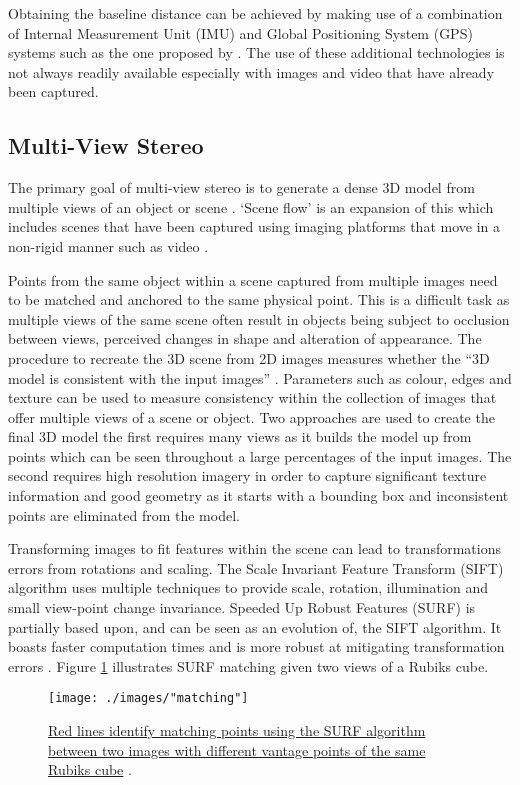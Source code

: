Obtaining the baseline distance can be achieved by making use of a combination of Internal Measurement Unit (IMU) and Global Positioning System (GPS) systems such as the one proposed by \citet{nutzi_fusion_2011}. The use of these additional technologies is not always readily available especially with images and video that have already been captured. 

\subsection{Multi-View Stereo \label{multi-view}}
The primary goal of multi-view stereo is to generate a dense 3D model from multiple views of an object or scene \citep{seitz_comparison_2006}. `Scene flow' is an expansion of this which includes scenes that have been captured using imaging platforms that move in a non-rigid manner such as video \citep{vedula_three-dimensional_2005}. 

Points from the same object within a scene captured from multiple images need to be matched and anchored to the same physical point. This is a difficult task as multiple views of the same scene often result in objects being subject to occlusion between views, perceived changes in shape and alteration of appearance. The procedure to recreate the 3D scene from 2D images measures whether the ``3D model is consistent with the input images'' \citep{mccann_3d_2015}. Parameters such as colour, edges and texture can be used to measure consistency within the collection of images that offer multiple views of a scene or object. Two approaches are used to create the final 3D model the first requires many views as it builds the model up from points which can be seen throughout a large percentages of the input images. The second requires high resolution imagery in order to capture significant texture information and good geometry as it starts with a bounding box and inconsistent points are eliminated from the model.

Transforming images to fit features within the scene can lead to transformations errors from rotations and scaling. The Scale Invariant Feature Transform (SIFT) algorithm uses multiple techniques to provide scale, rotation, illumination and small view-point change invariance. Speeded Up Robust Features (SURF) is partially based upon, and can be seen as an evolution of, the SIFT algorithm. It boasts faster computation times and is more robust at mitigating transformation errors \citep{bay_surf:_2006}. Figure \ref{SURF} illustrates SURF matching given two views of a Rubiks cube.
\newline
\begin{figure}[ht!]
	\centering
	\texttt{[image: ./images/"matching"]}
	\caption[SURF Feature matching on a Rubiks cube] {\href{http://rwbclasses.groups.et.byu.net/lib/exe/fetch.php?media=campus_challenge:vr_documentation.pdf}{Red lines identify matching points using the SURF algorithm between two images with different vantage points of the same Rubiks cube} \citep{anon._vision_2011}.}
	\label{SURF}
\end{figure}


